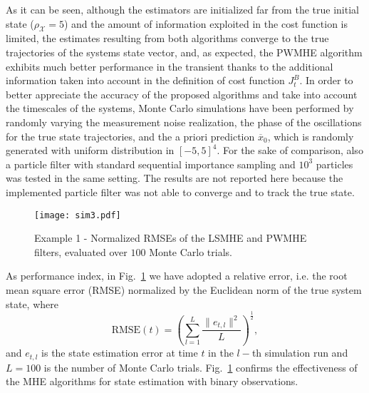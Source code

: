 \documentclass[11pt,journal,onecolumn]{IEEEtran}
\begin{document}
As it can be seen, although the estimators are initialized far from the true initial state ($\rho_{\mathcal X} = 5$) and the amount of information exploited in the cost function is limited, the estimates resulting from both algorithms converge to the true trajectories of the systems state vector, and, as  expected, the PWMHE algorithm exhibits much better performance in the transient  thanks to the additional information taken into account in the definition of cost function $J_{t}^{B}$. In order to better appreciate the accuracy of the proposed algorithms and take into account the timescales of the systems, Monte Carlo simulations have been performed by randomly varying the measurement noise realization, the phase of the oscillations for the true state trajectories, and the a priori prediction $\overline{x}_0$, which is randomly generated with uniform distribution in $[-5,5]^4$. For the sake of comparison, also a particle filter with standard sequential importance sampling and $10^3$ particles was tested in the same setting. The results are not reported here because the implemented particle filter was not able to converge and to track the true state.
\begin{figure}[h!]
\centering
\texttt{[image: sim3.pdf]}
\caption{Example 1 - Normalized RMSEs of the LSMHE and PWMHE filters, evaluated over $100$ Monte Carlo trials.}
\label{fig:RMSE}
\end{figure}
As performance index, in Fig.~\ref{fig:RMSE} we have adopted a relative error, i.e. the root mean square error (RMSE) normalized by the Euclidean norm of the true system state, where
\begin{equation}\label{64}
\text{RMSE}(t)=\left(\sum_{l=1}^{L}\frac{\|e_{t,l}\|^{2}}{L}\right)^{\frac{1}{2}},
\end{equation}
and $e_{t,l}$ is the state estimation error at time $t$ in the $l-$th simulation run and $L = 100$ is the number of Monte Carlo trials.
Fig.~\ref{fig:RMSE} confirms the effectiveness of the MHE algorithms for state estimation with binary observations.
\end{document}
